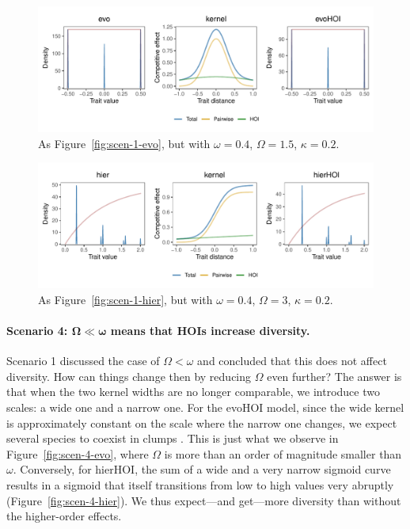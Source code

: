 \documentclass[10pt]{article}
\begin{document}
\begin{figure}[!ht]
  \centering
  \includegraphics[width=\textwidth]{scen-3-evo.pdf}
  \caption{As Figure~\ref{fig:scen-1-evo}, but with $\omega = 0.4$, $\Omega = 1.5$, $\kappa = 0.2$.}
  \label{fig:scen-3-evo}
\end{figure}

\begin{figure}[!ht]
  \centering
  \includegraphics[width=\textwidth]{scen-3-hier.pdf}
  \caption{As Figure~\ref{fig:scen-1-hier}, but with $\omega = 0.4$, $\Omega = 3$, $\kappa = 0.2$.}
  \label{fig:scen-3-hier}
\end{figure}

\clearpage

\paragraph{Scenario 4: $\bm{\Omega \ll \omega}$ means that HOIs increase diversity.}
Scenario 1 discussed the case of $\Omega < \omega$ and concluded that this does not affect diversity. How can things change then by reducing $\Omega$ even further? The answer is that when the two kernel widths are no longer comparable, we introduce two scales: a wide one and a narrow one. For the evoHOI model, since the wide kernel is approximately constant on the scale where the narrow one changes, we expect several species to coexist in clumps \citep{barabas_emergent_2013, dandrea_challenges_2016}. This is just what we observe in Figure~\ref{fig:scen-4-evo}, where $\Omega$ is more than an order of magnitude smaller than $\omega$. Conversely, for hierHOI, the sum of a wide and a very narrow sigmoid curve results in a sigmoid that itself transitions from low to high values very abruptly (Figure~\ref{fig:scen-4-hier}). We thus expect---and get---more diversity than without the higher-order effects.
\end{document}
